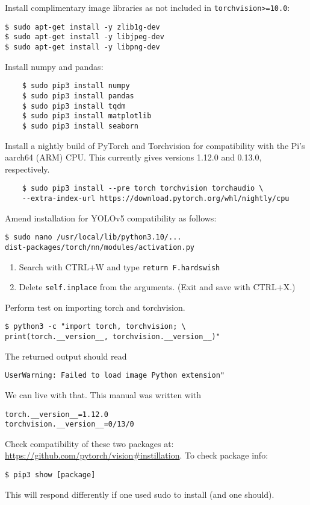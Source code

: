 \documentclass[12pt, a4paper, oneside]{article}
\begin{document}
Install complimentary image libraries as not included in \texttt{torchvision>=10.0}:
\begin{verbatim}
$ sudo apt-get install -y zlib1g-dev
$ sudo apt-get install -y libjpeg-dev
$ sudo apt-get install -y libpng-dev
\end{verbatim}
Install numpy and pandas:
\begin{verbatim}
	$ sudo pip3 install numpy
	$ sudo pip3 install pandas
	$ sudo pip3 install tqdm
	$ sudo pip3 install matplotlib
	$ sudo pip3 install seaborn
\end{verbatim}
Install a nightly build of PyTorch and Torchvision for compatibility with the Pi's aarch64 (ARM) CPU. This currently gives versions 1.12.0 and 0.13.0, respectively.
\begin{verbatim}
	$ sudo pip3 install --pre torch torchvision torchaudio \
	--extra-index-url https://download.pytorch.org/whl/nightly/cpu
\end{verbatim}
Amend installation for YOLOv5 compatibility as follows:
\begin{verbatim}
$ sudo nano /usr/local/lib/python3.10/...
dist-packages/torch/nn/modules/activation.py
\end{verbatim}
\begin{enumerate}
\item
Search with CTRL+W and type \texttt{return F.hardswish}
\item
Delete \texttt{self.inplace} from the arguments. (Exit and save with CTRL+X.)
\end{enumerate}
Perform test on importing torch and torchvision.
\begin{verbatim}
$ python3 -c "import torch, torchvision; \
print(torch.__version__, torchvision.__version__)"
\end{verbatim}
The returned output should read
\begin{verbatim}
UserWarning: Failed to load image Python extension"
\end{verbatim}
We can live with that. This manual was written with
\begin{verbatim}
torch.__version__=1.12.0
torchvision.__version__=0/13/0
\end{verbatim}
Check compatibility of these two packages at: \url{https://github.com/pytorch/vision#instillation}.
To check package info:
\begin{verbatim}
$ pip3 show [package]
\end{verbatim}
This will respond differently if one used sudo to install (and one should).
\end{document}
